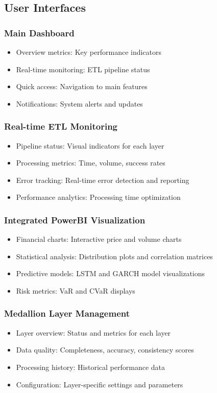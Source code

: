 \subsection{User Interfaces}
\subsubsection{Main Dashboard}
\begin{itemize}
    \item Overview metrics: Key performance indicators
    \item Real-time monitoring: ETL pipeline status
    \item Quick access: Navigation to main features
    \item Notifications: System alerts and updates
\end{itemize}

\subsubsection{Real-time ETL Monitoring}
\begin{itemize}
    \item Pipeline status: Visual indicators for each layer
    \item Processing metrics: Time, volume, success rates
    \item Error tracking: Real-time error detection and reporting
    \item Performance analytics: Processing time optimization
\end{itemize}

\subsubsection{Integrated PowerBI Visualization}
\begin{itemize}
    \item Financial charts: Interactive price and volume charts
    \item Statistical analysis: Distribution plots and correlation matrices
    \item Predictive models: LSTM and GARCH model visualizations
    \item Risk metrics: VaR and CVaR displays
\end{itemize}

\subsubsection{Medallion Layer Management}
\begin{itemize}
    \item Layer overview: Status and metrics for each layer
    \item Data quality: Completeness, accuracy, consistency scores
    \item Processing history: Historical performance data
    \item Configuration: Layer-specific settings and parameters
\end{itemize}

